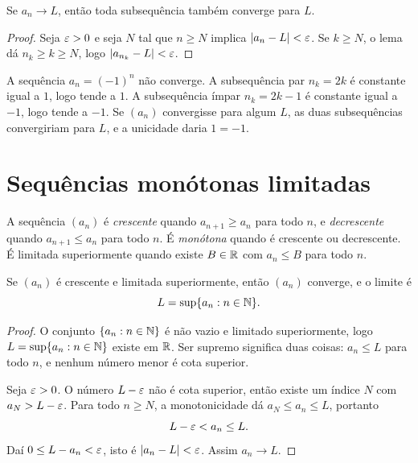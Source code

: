 \documentclass[11pt,a4paper]{article}
\begin{document}
\begin{teorema}
Se \(a_n\to L\), então toda subsequência também converge para \(L\).
\end{teorema}

\begin{proof}
Seja \(\varepsilon>0\) e seja \(N\) tal que \(n\ge N\) implica \(\left\lvert a_n-L \right\rvert<\varepsilon\). Se \(k\ge N\), o lema dá \(n_k\ge k\ge N\), logo \(\left\lvert a_{n_k}-L \right\rvert<\varepsilon\).
\end{proof}

\begin{contraexemplo}
A sequência \(a_n=(-1)^n\) não converge. A subsequência par \(n_k=2k\) é constante igual a \(1\), logo tende a \(1\). A subsequência ímpar \(n_k=2k-1\) é constante igual a \(-1\), logo tende a \(-1\). Se \((a_n)\) convergisse para algum \(L\), as duas subsequências convergiriam para \(L\), e a unicidade daria \(1=-1\).
\end{contraexemplo}

\section{Sequências monótonas limitadas}

\begin{definicao}
A sequência \((a_n)\) é \emph{crescente} quando \(a_{n+1}\ge a_n\) para todo \(n\), e \emph{decrescente} quando \(a_{n+1}\le a_n\) para todo \(n\). É \emph{monótona} quando é crescente ou decrescente. É limitada superiormente quando existe \(B\in\mathbb{R}\) com \(a_n\le B\) para todo \(n\).
\end{definicao}

\begin{teorema}
Se \((a_n)\) é crescente e limitada superiormente, então \((a_n)\) converge, e o limite é
\[
L=\sup\{a_n:n\in\mathbb{N}\}.
\]
\end{teorema}

\begin{proof}
O conjunto \(\{a_n:n\in\mathbb{N}\}\) é não vazio e limitado superiormente, logo \(L=\sup\{a_n:n\in\mathbb{N}\}\) existe em \(\mathbb{R}\). Ser supremo significa duas coisas: \(a_n\le L\) para todo \(n\), e nenhum número menor é cota superior.

Seja \(\varepsilon>0\). O número \(L-\varepsilon\) não é cota superior, então existe um índice \(N\) com \(a_N>L-\varepsilon\). Para todo \(n\ge N\), a monotonicidade dá \(a_N\le a_n\le L\), portanto
\[
L-\varepsilon<a_n\le L.
\]
Daí \(0\le L-a_n<\varepsilon\), isto é \(\left\lvert a_n-L \right\rvert<\varepsilon\). Assim \(a_n\to L\).
\end{proof}
\end{document}
